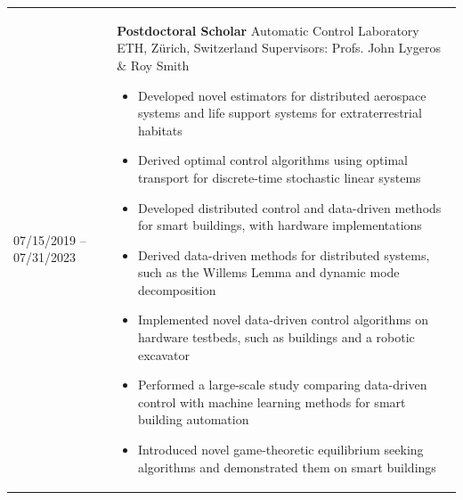 \begin{tabular}{p{} p{}}
07/15/2019 -- 07/31/2023 & \textbf{Postdoctoral Scholar}\newline
                        Automatic Control Laboratory \newline
                        ETH, Z\"{u}rich, Switzerland \newline
                        Supervisors: Profs. John Lygeros \& Roy Smith
                        \begin{itemize}
                          \item Developed novel estimators for distributed aerospace systems \newline and life support systems for extraterrestrial habitats
                          \item Derived optimal control algorithms using optimal transport \newline for discrete-time stochastic linear systems
                          \item Developed distributed control and data-driven methods for \newline smart buildings, with hardware implementations
                          \item Derived data-driven methods for distributed systems, such as \newline the Willems Lemma and dynamic mode decomposition
                          \item Implemented novel data-driven control algorithms on \newline hardware testbeds, such as buildings and a robotic excavator
                          \item Performed a large-scale study comparing data-driven control \newline with machine learning methods for smart building automation
                          \item Introduced novel game-theoretic equilibrium seeking algorithms \newline and demonstrated them on smart buildings
                        \end{itemize}
\end{tabular}
